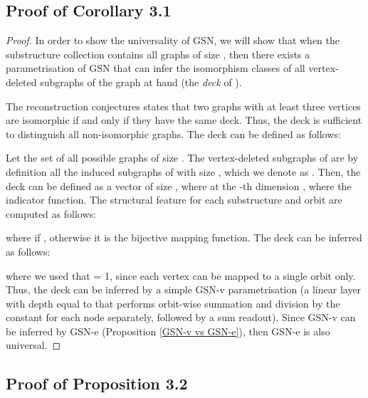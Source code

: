 \documentclass{article} \usepackage{iclr2021_conference,times}
\begin{document}
\subsection{Proof of Corollary 3.1}\label{proof_universality}
\begin{proof}
In order to show the universality of GSN, we will show that when the substructure collection contains all graphs of size , then there exists a parametrisation of GSN that can infer the isomorphism classes of all vertex-deleted subgraphs of the graph at hand  (the \textit{deck} of ). 

The reconstruction conjectures states that two graphs with at least three vertices are isomorphic if and only if they have the same deck. Thus, the deck is sufficient to distinguish all non-isomorphic graphs. The deck can be defined as follows:

Let  the set of all possible graphs of size . The vertex-deleted subgraphs of  are by definition all the induced subgraphs of  with size , which we denote as . Then, the deck  can be defined as a vector of size , where at the -th dimension , where  the indicator function. 
The structural feature   for each substructure  and orbit  are computed as follows:

where  if , otherwise it is the bijective mapping function. The deck can be inferred as follows:

where we used that  = 1, since each vertex can be mapped to a single orbit only. Thus, the deck can be inferred by a simple GSN-v parametrisation (a linear layer with depth equal to  that performs orbit-wise summation and division by the constant  for each node separately, followed by a sum readout). Since GSN-v can be inferred by GSN-e (Proposition \ref{GSN-v vs GSN-e}), then GSN-e is also universal.
\end{proof}


\subsection{Proof of Proposition 3.2}\label{proof_GSNv_GSNe}
\end{document}

